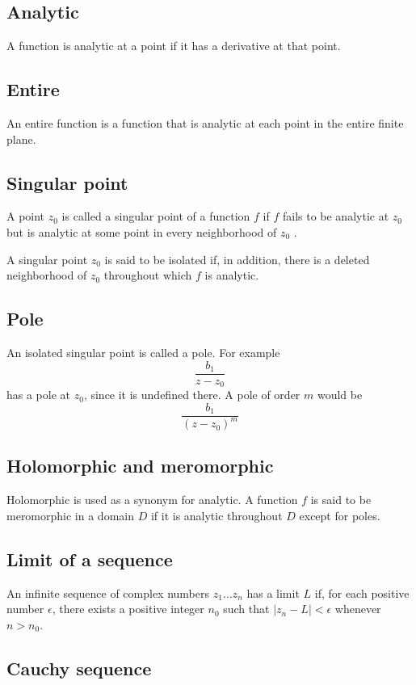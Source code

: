 \documentclass[11pt, oneside]{article}   	%
\begin{document}
\subsection*{Analytic}
A function is analytic at a point if it has a derivative at that point.

\subsection*{Entire}
An entire function is a function that is analytic at each point in the entire finite plane.

\subsection*{Singular point}
A point $z_0$ is called a singular point of a function $f$ if $f$ fails to be analytic at $z_0$  but is analytic at some point in every neighborhood of $z_0$ . 

A singular point $z_0$  is said to be isolated if, in addition, there is a deleted neighborhood  of $z_0$  throughout which $f$ is analytic.

\subsection*{Pole}
An isolated singular point is called a pole.  For example
\[ \frac{b_1}{z - z_0} \]
has a pole at $z_0$, since it is undefined there.  A pole of order $m$ would be
\[ \frac{b_1}{(z - z_0)^m} \]

\subsection*{Holomorphic and meromorphic}
Holomorphic is used as a synonym for analytic.  A function $f$ is said to be meromorphic in a domain $D$ if it is analytic throughout $D$ except for poles.

\subsection*{Limit of a sequence}
An infinite sequence of complex numbers $z_1 \dots z_n$ has a limit $L$ if, for each positive number $\epsilon$, there exists a positive integer $n_0$ such that $|z_n - L| < \epsilon$ whenever $n>n_0$.

\subsection*{Cauchy sequence}
\end{document}
